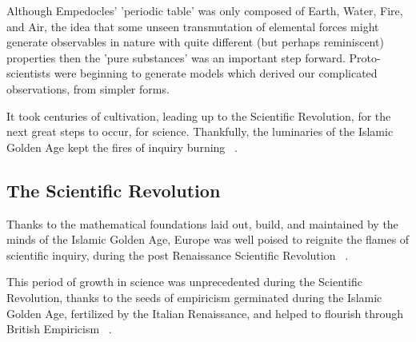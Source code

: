 Although Empedocles' 'periodic table' was only composed of Earth, Water, Fire,
and Air, the idea that some unseen transmutation of elemental forces might
generate observables in nature with quite different (but perhaps reminiscent)
properties then the 'pure substances' was an important step forward.
Proto-scientists were beginning to generate models which derived our complicated
observations, from simpler forms.

It took centuries of cultivation, leading up to the Scientific Revolution, for
the next great steps to occur, for science. Thankfully, the luminaries of the
Islamic Golden Age kept the fires of inquiry burning ~\needcite{}.

\clearpage
\subsection{The Scientific Revolution}

Thanks to the mathematical foundations laid out, build, and maintained by the
minds of the Islamic Golden Age, Europe was well poised to reignite the flames
of scientific inquiry, during the post Renaissance Scientific Revolution
~\needcite{}.

This period of growth in science was unprecedented during the Scientific
Revolution, thanks to the seeds of empiricism germinated during the Islamic
Golden Age, fertilized by the Italian Renaissance, and helped to flourish
through British Empiricism ~\needcite{}.

